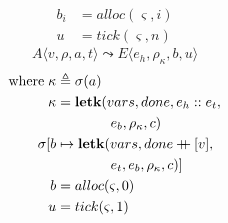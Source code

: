 \documentclass[12pt,draft]{article}
\newcommand\mdoubleplus{\ensuremath{\mathbin{+\mkern-9mu+}}}
\begin{document}
\begin{multicols*}{2}
\begin{align*}
b_i &= alloc(\varsigma, i) \\
u &= tick(\varsigma, n)
\end{align*}
\[
A\langle
v , \rho , a , t
\rangle
\leadsto
E\langle
e_h , \rho_{\kappa} , b , u
\rangle
\]
\vspace{-10mm}
\begin{align*}
\text{where}\; \kappa &\triangleq \sigma(a) \\
\kappa &= \textbf{letk}(vars, done, e_h::e_t, \\
&\;\;\;\;\;\;\;\;\;\;\;\;\;\; e_b , \rho_{\kappa}, c) \\
\sigma[b &\mapsto \textbf{letk}(vars, done \mdoubleplus [v], \\
&\;\;\;\;\;\;\;\;\;\;\;\;\;\; e_t , e_b , \rho_{\kappa} , c)] \\
b &= alloc(\varsigma, 0) \\
u &= tick(\varsigma, 1)
\end{align*}

\vfill\null
\columnbreak



\end{multicols*}
\end{document}
